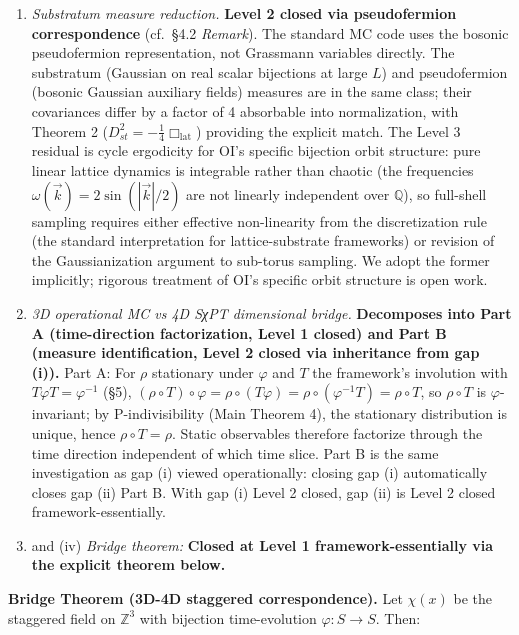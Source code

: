 \documentclass[
]{article}
\begin{document}
\begin{enumerate}
\def\labelenumi{(\roman{enumi})}
\item
  \emph{Substratum measure reduction.} \textbf{Level 2 closed via
  pseudofermion correspondence} (cf.~§4.2 \emph{Remark}). The standard
  MC code uses the bosonic pseudofermion representation, not Grassmann
  variables directly. The substratum (Gaussian on real scalar bijections
  at large \(L\)) and pseudofermion (bosonic Gaussian auxiliary fields)
  measures are in the same class; their covariances differ by a factor
  of 4 absorbable into normalization, with Theorem 2
  (\(D_{st}^2 = -\frac{1}{4}\Box_{\text{lat}}\)) providing the explicit
  match. The Level 3 residual is cycle ergodicity for OI's specific
  bijection orbit structure: pure linear lattice dynamics is integrable
  rather than chaotic (the frequencies
  \(\omega(\vec k) = 2\sin(|\vec k|/2)\) are not linearly independent
  over \(\mathbb{Q}\)), so full-shell sampling requires either effective
  non-linearity from the discretization rule (the standard
  interpretation for lattice-substrate frameworks) or revision of the
  Gaussianization argument to sub-torus sampling. We adopt the former
  implicitly; rigorous treatment of OI's specific orbit structure is
  open work.
\item
  \emph{3D operational MC vs 4D SχPT dimensional bridge.}
  \textbf{Decomposes into Part A (time-direction factorization, Level 1
  closed) and Part B (measure identification, Level 2 closed via
  inheritance from gap (i)).} Part A: For \(\rho\) stationary under
  \(\varphi\) and \(T\) the framework's involution with
  \(T\varphi T = \varphi^{-1}\) (§5),
  \((\rho \circ T) \circ \varphi = \rho \circ (T\varphi) = \rho \circ (\varphi^{-1}T) = \rho \circ T\),
  so \(\rho \circ T\) is \(\varphi\)-invariant; by P-indivisibility
  (Main Theorem 4), the stationary distribution is unique, hence
  \(\rho \circ T = \rho\). Static observables therefore factorize
  through the time direction independent of which time slice. Part B is
  the same investigation as gap (i) viewed operationally: closing gap
  (i) automatically closes gap (ii) Part B. With gap (i) Level 2 closed,
  gap (ii) is Level 2 closed framework-essentially.
\item
  and (iv) \emph{Bridge theorem:} \textbf{Closed at Level 1
  framework-essentially via the explicit theorem below.}
\end{enumerate}

\textbf{Bridge Theorem (3D-4D staggered correspondence).} Let
\(\chi(x)\) be the staggered field on \(\mathbb{Z}^3\) with bijection
time-evolution \(\varphi: S \to S\). Then:
\end{document}
